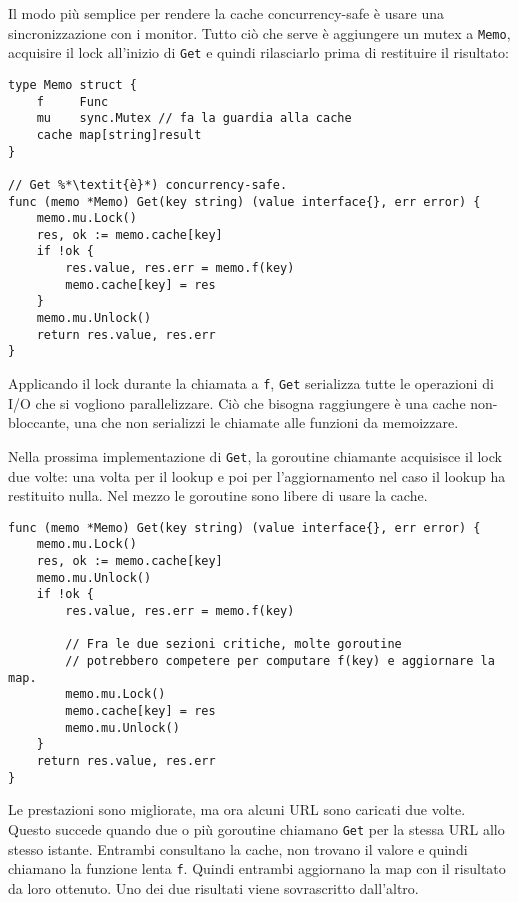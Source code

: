 \documentclass[../../thesis.tex]{subfiles}
\begin{document}
    Il modo più semplice per rendere la cache concurrency-safe è usare una sincronizzazione con i monitor.
    Tutto ciò che serve è aggiungere un mutex a \verb"Memo", acquisire il lock all'inizio di \verb"Get" e quindi rilasciarlo prima di restituire il risultato:
    \begin{lstlisting}[frame = single,label={lst:lstlisting9-7.5}]
type Memo struct {
    f     Func
    mu    sync.Mutex // fa la guardia alla cache
    cache map[string]result
}

// Get %*\textit{è}*) concurrency-safe.
func (memo *Memo) Get(key string) (value interface{}, err error) {
    memo.mu.Lock()
    res, ok := memo.cache[key]
    if !ok {
        res.value, res.err = memo.f(key)
        memo.cache[key] = res
    }
    memo.mu.Unlock()
    return res.value, res.err
}
    \end{lstlisting}
    Applicando il lock durante la chiamata a \verb"f", \verb"Get" serializza tutte le operazioni di I/O che si vogliono parallelizzare.
    Ciò che bisogna raggiungere è una cache non-bloccante, una che non serializzi le chiamate alle funzioni da memoizzare.
    \hfill \vspace{12pt}

    Nella prossima implementazione di \verb"Get", la goroutine chiamante acquisisce il lock due volte: una volta per il lookup e poi per l'aggiornamento nel caso il lookup ha restituito nulla.
    Nel mezzo le goroutine sono libere di usare la cache.
    \begin{lstlisting}[frame = single,label={lst:lstlisting9-7.6}]
func (memo *Memo) Get(key string) (value interface{}, err error) {
    memo.mu.Lock()
    res, ok := memo.cache[key]
    memo.mu.Unlock()
    if !ok {
        res.value, res.err = memo.f(key)
        
        // Fra le due sezioni critiche, molte goroutine
        // potrebbero competere per computare f(key) e aggiornare la map.
        memo.mu.Lock()
        memo.cache[key] = res
        memo.mu.Unlock()
    }
    return res.value, res.err
}
    \end{lstlisting}
    Le prestazioni sono migliorate, ma ora alcuni URL sono caricati due volte.
    Questo succede quando due o più goroutine chiamano \verb"Get" per la stessa URL allo stesso istante.
    Entrambi consultano la cache, non trovano il valore e quindi chiamano la funzione lenta \verb"f".
    Quindi entrambi aggiornano la map con il risultato da loro ottenuto.
    Uno dei due risultati viene sovrascritto dall'altro.
    \hfill \vspace{12pt}
\end{document}
